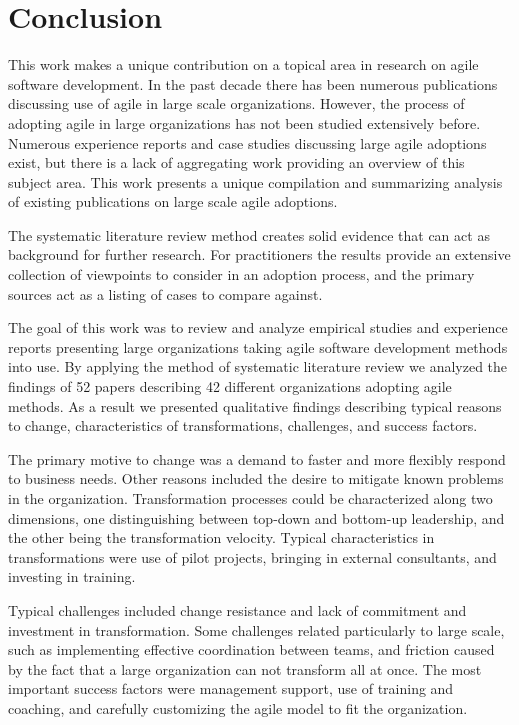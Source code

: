\section{Conclusion}

This work makes a unique contribution on a topical area in research on agile
software development. In the past decade there has been numerous publications
discussing use of agile in large scale organizations. However, the process of
adopting agile in large organizations has not been studied extensively before.
Numerous experience reports and case studies discussing large agile adoptions
exist, but there is a lack of aggregating work providing an overview of this
subject area.
This work presents a unique compilation and summarizing analysis of existing
publications on large scale agile adoptions.

The systematic literature review method creates solid evidence that can act as
background for further research.
For practitioners the results provide an extensive collection of viewpoints to
consider in an adoption process, and the primary sources act as a listing of
cases to compare against.

The goal of this work was to review and analyze empirical studies and experience
reports presenting large organizations taking agile software development methods
into use. By applying the method of systematic literature review we analyzed the
findings of 52 papers describing 42 different organizations adopting agile
methods. As a result we presented qualitative findings describing typical
reasons to change, characteristics of transformations, challenges, and success
factors.

The primary motive to change was a demand to faster and more flexibly respond to
business needs. Other reasons included the desire to mitigate known problems in
the organization.
Transformation processes could be characterized along two dimensions,
one distinguishing between top-down and bottom-up leadership, and the other
being the transformation velocity. Typical characteristics in transformations
were use of pilot projects, bringing in external consultants, and investing in
training.

Typical challenges included change resistance and lack of commitment and
investment in transformation. Some challenges related particularly to large
scale, such as implementing effective coordination between teams, and friction
caused by the fact that a large organization can not transform all at once.
The most important success factors were management support, use of training and
coaching, and carefully customizing the agile model to fit the organization.

